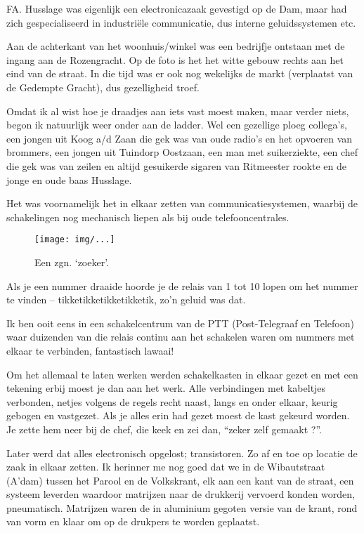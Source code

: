 \documentclass[10pt,twoside,openright]{memoir}
\begin{document}
FA. Husslage was eigenlijk een electronicazaak gevestigd op de Dam, maar had zich gespecialiseerd in industriële communicatie, dus interne geluidssystemen etc. 

Aan de achterkant van het woonhuis/winkel was een bedrijfje ontstaan met de ingang aan de Rozengracht. Op de foto is het het witte gebouw rechts aan het eind van de straat. 
In die tijd was er ook nog wekelijks de markt (verplaatst van de Gedempte Gracht), dus gezelligheid troef. 

Omdat ik al wist hoe je draadjes aan iets vast moest maken, maar verder niets, begon ik natuurlijk weer onder aan de ladder. Wel een gezellige ploeg collega’s, een jongen uit Koog a/d Zaan die gek was van oude radio’s en het opvoeren van brommers, een jongen uit Tuindorp Oostzaan, een man met suikerziekte, een chef die gek was van zeilen en altijd gesuikerde sigaren van Ritmeester rookte en de jonge en oude baas Husslage. 

Het was voornamelijk het in elkaar zetten van communicatiesystemen, waarbij de schakelingen nog mechanisch liepen als bij oude telefooncentrales. 

\begin{figure}[t]
\texttt{[image: img/...]}
\caption{Een zgn. ‘zoeker’.}
\end{figure}

Als je een nummer draaide hoorde je de relais van 1 tot 10 lopen om het nummer te vinden – tikketikketikketikketik, zo’n geluid was dat. 

Ik ben ooit eens in een schakelcentrum van de PTT (Post-Telegraaf en Telefoon) waar duizenden van die relais continu aan het schakelen waren om nummers met elkaar te verbinden, fantastisch lawaai! 

Om het allemaal te laten werken werden schakelkasten in elkaar gezet en met een tekening erbij moest je dan aan het werk. Alle verbindingen met kabeltjes verbonden, netjes volgens de regels recht naast, langs en onder elkaar, keurig gebogen en vastgezet. Als je alles erin had gezet moest de kast gekeurd worden. Je zette hem neer bij de chef, die keek en zei dan, ``zeker zelf gemaakt ?''.

Later werd dat alles electronisch opgelost; transistoren. Zo af en toe op locatie de zaak in elkaar zetten. Ik herinner me nog goed dat we in de Wibautstraat (A’dam) tussen het Parool en de Volkskrant, elk aan een kant van de straat, een systeem leverden waardoor matrijzen naar de drukkerij vervoerd konden worden, pneumatisch. Matrijzen waren de in aluminium gegoten versie van de krant, rond van vorm en klaar om op de drukpers te worden geplaatst. 
\end{document}
